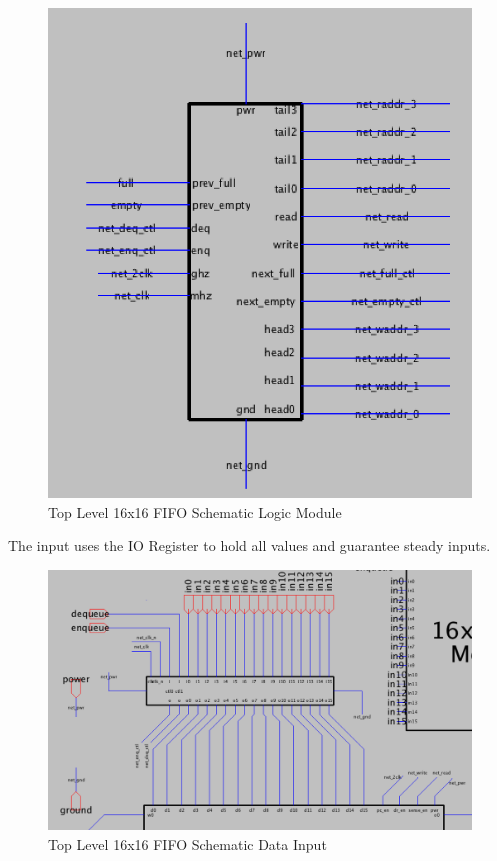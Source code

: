 \documentclass[a4paper]{article}
\begin{document}
\begin{figure}[H]
	\centering
	\includegraphics[scale=0.65]{topLevelSchematicLogic}
	\caption{Top Level 16x16 FIFO Schematic Logic Module}
	\label{fig:topLevelSchematicLogic}
\end{figure}

The input uses the IO Register to hold all values and guarantee steady inputs.

\begin{figure}[H]
	\centering
	\includegraphics[scale=0.4]{topLevelSchematicTop}
	\caption{Top Level 16x16 FIFO Schematic Data Input}
	\label{fig:topLevelSchematicTop}
\end{figure}
\end{document}
